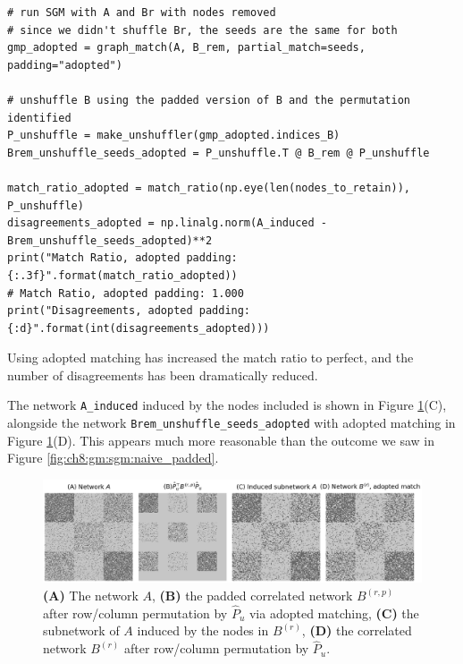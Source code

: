 \begin{lstlisting}[style=python]
# run SGM with A and Br with nodes removed
# since we didn't shuffle Br, the seeds are the same for both
gmp_adopted = graph_match(A, B_rem, partial_match=seeds, padding="adopted")

# unshuffle B using the padded version of B and the permutation identified
P_unshuffle = make_unshuffler(gmp_adopted.indices_B)
Brem_unshuffle_seeds_adopted = P_unshuffle.T @ B_rem @ P_unshuffle

match_ratio_adopted = match_ratio(np.eye(len(nodes_to_retain)), P_unshuffle)
disagreements_adopted = np.linalg.norm(A_induced - Brem_unshuffle_seeds_adopted)**2
print("Match Ratio, adopted padding: {:.3f}".format(match_ratio_adopted))
# Match Ratio, adopted padding: 1.000
print("Disagreements, adopted padding: {:d}".format(int(disagreements_adopted)))
\end{lstlisting}

Using adopted matching has increased the match ratio to perfect, and the number of disagreements has been dramatically reduced.

The network \texttt{A\_induced} induced by the nodes included is shown in Figure \ref{fig:ch8:gm:sgm:adopted}(C), alongside the network \texttt{Brem\_unshuffle\_seeds\_adopted} with adopted matching in Figure \ref{fig:ch8:gm:sgm:adopted}(D). This appears much more reasonable than the outcome we saw in Figure \ref{fig:ch8:gm:sgm:naive_padded}.

\begin{figure}
    \centering
    \includegraphics[width=\linewidth]{applications/ch8/Images/gm_adopted.png}
    \caption{\textbf{(A)} The network $A$, \textbf{(B)} the padded correlated network $B^{(r,p)}$ after row/column permutation by $\hat P_u$ via adopted matching, \textbf{(C)} the subnetwork of $A$ induced by the nodes in $B^{(r)}$, \textbf{(D)} the correlated network $B^{(r)}$ after row/column permutation by $\hat P_u$.}
    \label{fig:ch8:gm:sgm:adopted}
\end{figure}

